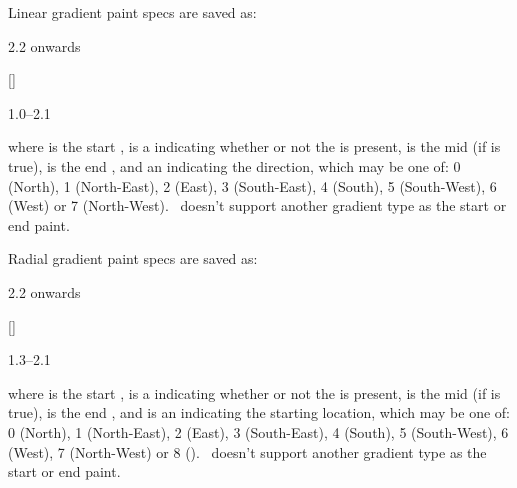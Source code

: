 \begin{deflist}
\begin{itemdesc}
Linear gradient paint specs are saved as:
\begin{jdrversion}{2.2 onwards}
\begin{syntaxline}
  []
 
\end{syntaxline}
\end{jdrversion}
\begin{jdrversion}{1.0--2.1}
\begin{syntaxline}
  
\end{syntaxline}
\end{jdrversion}
where  is the start ,
 is a  indicating whether or not
the  is present,
 is the mid  (if  is true),
 is the end ,
and  an  indicating the
direction, which may be one of: 0 (North), 1 (North-East), 2 (East),
3 (South-East), 4 (South), 5 (South-West), 6 (West) or 7 (North-West).
\FlowframTk\ doesn't support another gradient type as the
start or end paint.
\end{itemdesc}

\begin{itemdesc}
Radial gradient paint specs are saved as:
\begin{jdrversion}{2.2 onwards}
\begin{syntaxline}
  []
 
\end{syntaxline}
\end{jdrversion}
\begin{jdrversion}{1.3--2.1}
\begin{syntaxline}
  
\end{syntaxline}
\end{jdrversion}
where  is the start ,
 is a  indicating whether or not
the  is present,
 is the mid  (if  is true),
 is the end ,
and  is an  indicating the
starting location, which may be one of: 0 (North), 1 (North-East), 2 (East),
3 (South-East), 4 (South), 5 (South-West), 6 (West), 7 (North-West)
or 8 ().
\FlowframTk\ doesn't support another gradient type as the
start or end paint.
\end{itemdesc}

\end{deflist}

